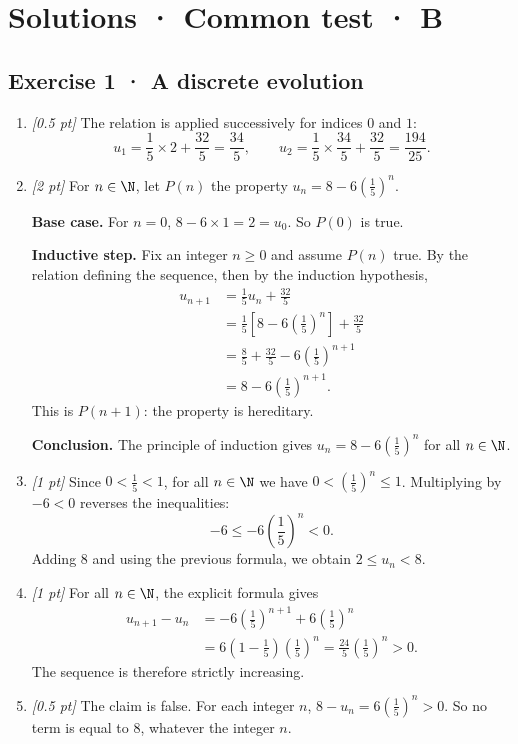 \ifmxteacher\mxnewpage

\section*{Solutions · Common test · B}\label{cor:3-4}

\subsection*{Exercise 1 · A discrete evolution}\begin{enumerate}

\item \textit{[0.5 pt]} The relation is applied successively for indices $0$ and $1$:\[u_1=\frac{1}{5}\times 2+\frac{32}{5}=\frac{34}{5},\qquad u_2=\frac{1}{5}\times \frac{34}{5}+\frac{32}{5}=\frac{194}{25}.\]

\item \textit{[2 pt]} For $n\in\N$, let $P(n)$ the property $u_n=8-6\left(\frac{1}{5}\right)^n$.
\par\smallskip\textbf{Base case.} For $n=0$, $8-6\times1=2=u_0$. So $P(0)$ is true.
\par\smallskip\textbf{Inductive step.} Fix an integer $n\ge0$ and assume $P(n)$ true. By the relation defining the sequence, then by the induction hypothesis,
\[\begin{aligned}u_{n+1}&=\frac{1}{5}u_n+\frac{32}{5}\\
&=\frac{1}{5}\left[8-6\left(\frac{1}{5}\right)^n\right]+\frac{32}{5}\\
&=\frac{8}{5}+\frac{32}{5}-6\left(\frac{1}{5}\right)^{n+1}\\
&=8-6\left(\frac{1}{5}\right)^{n+1}.
\end{aligned}\]
This is $P(n+1)$: the property is hereditary.
\par\smallskip\textbf{Conclusion.} The principle of induction gives $u_n=8-6\left(\frac{1}{5}\right)^n$ for all $n\in\N$.

\item \textit{[1 pt]} Since $0<\frac{1}{5}<1$, for all $n\in\N$ we have $0<(\frac{1}{5})^n\le1$. Multiplying by $-6<0$ reverses the inequalities:
\[-6\le-6(\frac{1}{5})^n<0.\]
Adding $8$ and using the previous formula, we obtain $2\le u_n<8$.

\item \textit{[1 pt]} For all $n\in\N$, the explicit formula gives
\[\begin{aligned}u_{n+1}-u_n&=-6(\frac{1}{5})^{n+1}+6(\frac{1}{5})^n\\&=6(1-\frac{1}{5})(\frac{1}{5})^n=\frac{24}{5}(\frac{1}{5})^n>0.\end{aligned}\]
The sequence is therefore strictly increasing.

\item \textit{[0.5 pt]} The claim is false. For each integer $n$, $8-u_n=6(\frac{1}{5})^n>0$. So no term is equal to $8$, whatever the integer $n$.

\end{enumerate}

